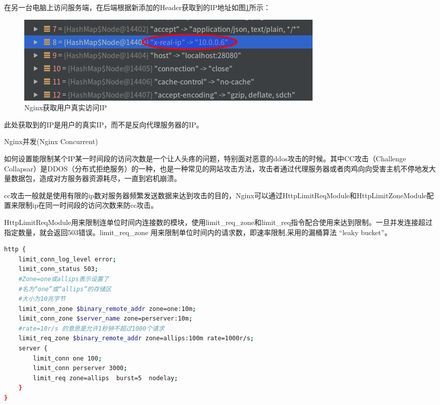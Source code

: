 \documentclass[12pt]{book}
\makeatletter
\numberwithin{dummy}{section}
\theoremstyle{ocrenumbox}
\theoremstyle{blacknumex}
\theoremstyle{blacknumbox}
\theoremstyle{ocrenum}
\renewcommand{\subsection}{\@startsection {subsection}{2}{\z@}
	{-3ex \@plus -0.1ex \@minus -.4ex}
	{0.5ex \@plus.2ex }
	{\normalfont\sffamily\bfseries}}
\makeatother
\begin{document}
在另一台电脑上访问服务端，在后端根据新添加的Header获取到的IP地址如图\ref{fig:nginxgetrealip}所示：

\begin{figure}[htbp]
	\centering
	\includegraphics[scale=0.6]{nginxgetrealip.png}
	\caption{Nginx获取用户真实访问IP}
	\label{fig:nginxgetrealip}
\end{figure}

此处获取到的IP是用户的真实IP，而不是反向代理服务器的IP。

\subsection{Nginx并发(Nginx Concurrent)}

如何设置能限制某个IP某一时间段的访问次数是一个让人头疼的问题，特别面对恶意的ddos攻击的时候。其中CC攻击（Challenge Collapsar）是DDOS（分布式拒绝服务）的一种，也是一种常见的网站攻击方法，攻击者通过代理服务器或者肉鸡向向受害主机不停地发大量数据包，造成对方服务器资源耗尽，一直到宕机崩溃。

cc攻击一般就是使用有限的ip数对服务器频繁发送数据来达到攻击的目的，Nginx可以通过HttpLimitReqModule和HttpLimitZoneModule配置来限制ip在同一时间段的访问次数来防cc攻击。

HttpLimitReqModule用来限制连单位时间内连接数的模块，使用limit\_req\_zone和limit\_req指令配合使用来达到限制。一旦并发连接超过指定数量，就会返回503错误。limit\_req\_zone 用来限制单位时间内的请求数，即速率限制,采用的漏桶算法 “leaky bucket”。

\begin{lstlisting}[language=bash]
http {
	limit_conn_log_level error;
	limit_conn_status 503;
	#Zone=one或allips表示设置了
	#名为“one”或“allips”的存储区
	#大小为10兆字节
	limit_conn_zone $binary_remote_addr zone=one:10m;
	limit_conn_zone $server_name zone=perserver:10m;
	#rate=10r/s 的意思是允许1秒钟不超过1000个请求
	limit_req_zone $binary_remote_addr zone=allips:100m rate=1000r/s;  
	server {
		limit_conn one 100;
		limit_conn perserver 3000;
		limit_req zone=allips  burst=5  nodelay;
	}
}
\end{lstlisting}
\end{document}
